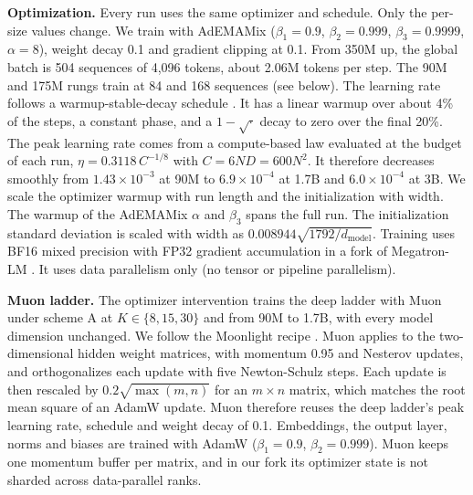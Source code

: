 \textbf{Optimization.} Every run uses the same optimizer and schedule. Only the per-size values change. We train with AdEMAMix \citep{pagliardini_ademamix_2024} ($\beta_1 = 0.9$, $\beta_2 = 0.999$, $\beta_3 = 0.9999$, $\alpha = 8$), weight decay 0.1 and gradient clipping at 0.1. From 350M up, the global batch is 504 sequences of 4,096 tokens, about 2.06M tokens per step. The 90M and 175M rungs train at 84 and 168 sequences (see below). The learning rate follows a warmup-stable-decay schedule \citep{hagele_scaling_2024}. It has a linear warmup over about 4\% of the steps, a constant phase, and a $1-\sqrt{\cdot}$ decay to zero over the final 20\%. The peak learning rate comes from a compute-based law evaluated at the budget of each run, $\eta = 0.3118\, C^{-1/8}$ with $C = 6 N D = 600 N^2$. It therefore decreases smoothly from $1.43 \times 10^{-3}$ at 90M to $6.9 \times 10^{-4}$ at 1.7B and $6.0 \times 10^{-4}$ at 3B. We scale the optimizer warmup with run length and the initialization with width. The warmup of the AdEMAMix $\alpha$ and $\beta_3$ spans the full run. The initialization standard deviation is scaled with width as $0.008944 \sqrt{1792 / d_{\mathrm{model}}}$. Training uses BF16 mixed precision with FP32 gradient accumulation in a fork of Megatron-LM \citep{shoeybi_megatron-lm_2019}. It uses data parallelism only (no tensor or pipeline parallelism).

\textbf{Muon ladder.} The optimizer intervention trains the deep ladder with Muon \citep{jordan_muon_2024} under scheme A at $K \in \{8, 15, 30\}$ and from 90M to 1.7B, with every model dimension unchanged. We follow the Moonlight recipe \citep{liu_muon_2025}. Muon applies to the two-dimensional hidden weight matrices, with momentum 0.95 and Nesterov updates, and orthogonalizes each update with five Newton-Schulz steps. Each update is then rescaled by $0.2\sqrt{\max(m, n)}$ for an $m \times n$ matrix, which matches the root mean square of an AdamW update. Muon therefore reuses the deep ladder's peak learning rate, schedule and weight decay of 0.1. Embeddings, the output layer, norms and biases are trained with AdamW ($\beta_1 = 0.9$, $\beta_2 = 0.999$). Muon keeps one momentum buffer per matrix, and in our fork its optimizer state is not sharded across data-parallel ranks.

